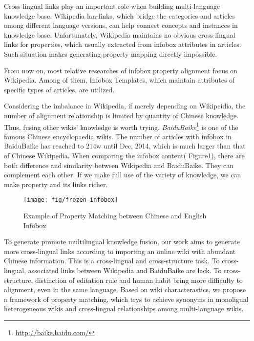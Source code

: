 \documentclass[runningheads,a4paper]{llncs}
\begin{document}

Cross-lingual links play an important role when building multi-language knowledge base. Wikipedia lan-links, which bridge the categories and articles among different language versions, can help connect concepts and instances in knowledge base. Unfortunately, Wikipedia maintains no obvious cross-lingual links for properties, which usually extracted from infobox attributes in articles. Such situation makes generating property mapping directly impossible.

From now on, most relative researches of infobox property alignment focus on Wikipedia. Among of them, Infobox Templates, which maintain attributes of specific types of articles, are utilized. 

Considering the imbalance in Wikipedia, if merely depending on Wikipeidia, the number of alignment relationship is limited by quantity of Chinese knowledge. Thus, fusing other wikis' knowledge is worth trying. \emph{BaiduBaike}\footnote{\url{http://baike.baidu.com/}} is one of the famous Chinese encyclopaedia wikis. The number of articles with infobox in BaiduBaike has reached to 214w until Dec, 2014, which is much larger than that of Chinese Wikipedia. When comparing the infobox content( Figure\ref{fig:frozen-infobox}), there are both difference and similarity between Wikipedia and BaiduBaike. They can complement each other. If we make full use of the variety of knowledge, we can make property and its links richer.

\begin{figure}[h]
  \centering
  \texttt{[image: fig/frozen-infobox]}
  \caption{Example of Property Matching between Chinese and English Infobox}
  \label{fig:frozen-infobox}
\end{figure}

To generate promote multilingual knowledge fusion, our work aims to generate more cross-lingual links according to importing an online wiki with abundant Chinese information. This is a cross-lingual and cross-structure task. To cross-lingual, associated links between Wikipedia and BaiduBaike are lack. To cross-structure, distinction of editation rule and human habit bring more difficulty to alignment, even in the same language. Based on wiki characterastics, we propose a framework of property matching, which trys to achieve synonyms in monoligual heterogeneous wikis and cross-lingual relationships among multi-language wikis.
\end{document}
